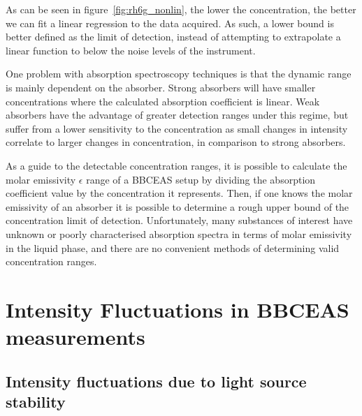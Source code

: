 As can be seen in figure~\ref{fig:rh6g_nonlin}, the lower the concentration, the
better we can fit a linear regression to the data acquired. As such, a lower
bound is better defined as the limit of detection, instead of attempting to
extrapolate a linear function to below the noise levels of the instrument.

One problem with absorption spectroscopy techniques is that the dynamic range
is mainly dependent on the absorber. Strong absorbers will have smaller
concentrations where the calculated absorption coefficient is linear. Weak
absorbers have the advantage of greater detection ranges under this regime,
but suffer from a lower sensitivity to the concentration as small changes
in intensity correlate to larger changes in concentration, in comparison to
strong absorbers.

As a guide to the detectable concentration ranges, it is possible to calculate
the molar emissivity $\epsilon$ range of a \ac{BBCEAS} setup by dividing the
absorption coefficient value by the concentration it represents. Then, if
one knows the molar emissivity of an absorber it is possible to determine a
rough upper bound of the concentration limit of detection. Unfortunately, many
substances of interest have unknown or poorly characterised absorption spectra
in terms of molar emissivity in the liquid phase, and there are no convenient
methods of determining valid concentration ranges.

\section{Intensity Fluctuations in BBCEAS measurements}\label{sec:light_fluc}


\subsection{Intensity fluctuations due to light source stability}\label{subsec:laser_fluc}


